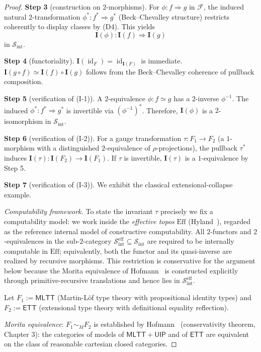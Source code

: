 \documentclass[11pt]{article}
\theoremstyle{plain}
\theoremstyle{definition}
\newcommand{\cS}{\mathcal{S}}
\newcommand{\cF}{\mathcal{F}}
\newcommand{\Sint}{\cS_{\mathrm{int}}}
\newcommand{\MLTT}{\mathsf{MLTT}}
\newcommand{\ETT}{\mathsf{ETT}}
\newcommand{\II}{\mathbf{I}}
\DeclareMathOperator{\id}{id}
\begin{document}
\begin{proof}
\textbf{Step 3} (construction on $2$-morphisms). For $\phi : f \Rightarrow g$ in $\cF$, the induced natural $2$-transformation $\phi^* : f^* \Rightarrow g^*$ (Beck--Chevalley structure) restricts coherently to display classes by (D4). This yields
\[ \II(\phi) : \II(f) \Rightarrow \II(g) \]
in $\Sint$.

\textbf{Step 4} (functoriality). $\II(\id_F) = \id_{\II(F)}$ is immediate. $\II(g \circ f) \simeq \II(f) \circ \II(g)$ follows from the Beck--Chevalley coherence of pullback composition.

\textbf{Step 5} (verification of (I-1)). A $2$-equivalence $\phi : f \simeq g$ has a $2$-inverse $\phi^{-1}$. The induced $\phi^* : f^* \Rightarrow g^*$ is invertible via $(\phi^{-1})^*$. Therefore, $\II(\phi)$ is a $2$-isomorphism in $\Sint$.

\textbf{Step 6} (verification of (I-2)). For a gauge transformation $\tau : F_1 \to F_2$ (a $1$-morphism with a distinguished $2$-equivalence of $\rho$-projections), the pullback $\tau^*$ induces $\II(\tau) : \II(F_2) \to \II(F_1)$. If $\tau$ is invertible, $\II(\tau)$ is a $1$-equivalence by Step 5.

\textbf{Step 7} (verification of (I-3)). We exhibit the classical extensional-collapse example.

\emph{Computability framework.} To state the invariant $\tau$ precisely we fix a computability model: we work inside the \emph{effective topos} $\mathrm{Eff}$ (Hyland~\cite{Hyland1982}), regarded as the reference internal model of constructive computability. All $2$-functors and $2$-equivalences in the sub-$2$-category $\Sint^{\mathrm{eff}} \subseteq \Sint$ are required to be internally computable in $\mathrm{Eff}$; equivalently, both the functor and its quasi-inverse are realized by recursive morphisms. This restriction is conservative for the argument below because the Morita equivalence of Hofmann~\cite{Hofmann1995} is constructed explicitly through primitive-recursive translations and hence lies in $\Sint^{\mathrm{eff}}$.

Let $F_1 := \MLTT$ (Martin-L\"of type theory with propositional identity types) and $F_2 := \ETT$ (extensional type theory with definitional equality reflection).

\emph{Morita equivalence}: $F_1 \sim_M F_2$ is established by Hofmann~\cite{Hofmann1995} (conservativity theorem, Chapter 3): the categories of models of $\MLTT + \mathsf{UIP}$ and of $\ETT$ are equivalent on the class of reasonable cartesian closed categories.


\end{proof}
\end{document}
